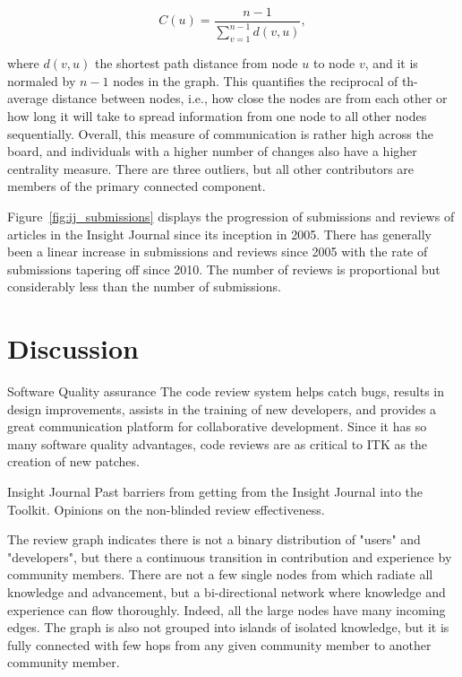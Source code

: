 \documentclass{frontiersENG} %
\begin{document}
\begin{equation}
   C(u) = \frac{n - 1}{\sum_{v=1}^{n-1} d(v, u)},
\end{equation}

where $d(v, u)$ the shortest path distance from node $u$ to node $v$, and it
is normaled by $n-1$ nodes in the graph. This quantifies the reciprocal of th-
average distance between nodes, i.e., how close the nodes are from each other
or how long it will take to spread information from one node to all other
nodes sequentially\cite{Newman2005}. Overall, this measure of communication is
rather high across the board, and individuals with a higher
number of changes also have a higher centrality measure.  There are three
outliers, but all other contributors are members of the primary connected
component.

Figure~\ref{fig:ij_submissions} displays the progression of submissions and
reviews of articles in the Insight Journal since its inception in 2005.  There
has generally been a linear increase in submissions and reviews since 2005
with the rate of submissions tapering off since 2010.  The number of reviews
is proportional but considerably less than the number of submissions.



\section{Discussion}
Software Quality assurance
The code review system helps catch bugs, results in design improvements, assists in the training of new developers, and provides a great communication platform for collaborative development. Since it has so many software quality advantages, code reviews are as critical to ITK as the creation of new patches.


Insight Journal
Past barriers from getting from the Insight Journal into the Toolkit.  Opinions on the
non-blinded review effectiveness.

The review graph indicates there is not a binary distribution of "users" and
"developers", but there a continuous transition in contribution and experience
by community members. There are not a few single nodes from which radiate all
knowledge and advancement, but a bi-directional network where knowledge and
experience can flow thoroughly.  Indeed, all the large nodes have many
incoming edges. The graph is also not grouped into islands of
isolated knowledge, but it is fully connected with few hops from any given
community member to another community member.
\end{document}
